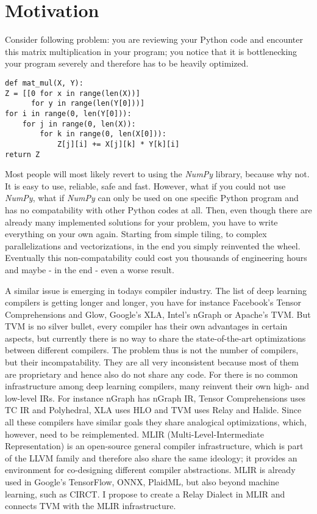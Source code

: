 \section{Motivation}

Consider following problem: you are reviewing your Python code and encounter this matrix multiplication in your program; you notice that
it is bottlenecking your program severely and therefore has to be heavily optimized. 
\begin{verbatim}
def mat_mul(X, Y):
Z = [[0 for x in range(len(X))]
      for y in range(len(Y[0]))]
for i in range(0, len(Y[0])):
    for j in range(0, len(X)):
        for k in range(0, len(X[0])):
            Z[j][i] += X[j][k] * Y[k][i]
return Z
\end{verbatim}
Most people will most likely revert to using the {\it NumPy} library, because why not.
It is easy to use, reliable, safe and fast. However, what if you could not use {\it NumPy}, what 
if {\it NumPy} can only be used on one specific Python program and has no compatability with other
Python codes at all. Then, even though there are already many implemented solutions for your problem,
you have to write everything on your own again. Starting from simple tiling, to complex parallelizations
and vectorizations, in the end you simply reinvented the wheel. Eventually this non-compatability
could cost you thousands of engineering hours and maybe - in the end - even a worse result.

A similar issue is emerging in todays compiler industry. The list of deep learning compilers is
getting longer and longer, you have for instance Facebook's Tensor Comprehensions and Glow, Google's XLA, Intel's nGraph or Apache's TVM.
But TVM is no silver bullet, every compiler has their own advantages in certain aspects, but currently there 
is no way to share the state-of-the-art optimizations between different compilers.
The problem thus is not the number of compilers, but their incompatability. They are all very inconsistent because 
most of them are proprietary and hence also do not share any code. 
For there is no common infrastructure among deep learning compilers, many reinvent their own high- and low-level IRs.
For instance nGraph has nGraph IR, Tensor Comprehensions uses TC IR and Polyhedral, XLA uses HLO and TVM uses Relay and Halide.
Since all these compilers have similar goals they share analogical optimizations, which, however, need to be reimplemented.
MLIR (Multi-Level-Intermediate Representation) is an open-source general compiler infrastructure, which 
is part of the LLVM family and therefore also share the same ideology; it provides an environment for co-designing different compiler abstractions.
MLIR is already used in Google's TensorFlow, ONNX, PlaidML, but also beyond machine learning, such as CIRCT.
I propose to create a Relay Dialect in MLIR and connects TVM with the MLIR infrastructure.
